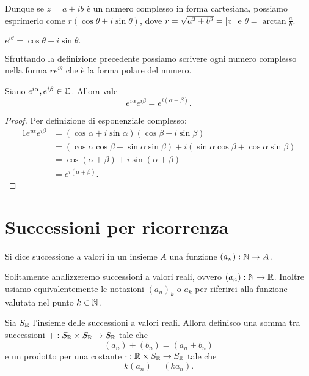 Dunque se $z = a+ib$ è un numero complesso in forma cartesiana, possiamo esprimerlo come $r(\cos\theta + i\sin\theta)$, dove $r = \sqrt{a^2 + b^2} = \left|z\right|$ e $\theta = \arctan \frac{a}{b}$.

\begin{definition}
    $e^{i\theta} = \cos\theta + i\sin\theta.$
\end{definition}

Sfruttando la definizione precedente possiamo scrivere ogni numero complesso nella forma $re^{i\theta}$ che è la forma polare del numero.

\begin{proposition}
    Siano $e^{i\alpha}, e^{i\beta} \in \mathbb{C}$. Allora vale \[
        e^{i\alpha} e^{i\beta} = e^{i(\alpha + \beta)}.
    \]
\end{proposition}
\begin{proof}
    Per definizione di esponenziale complesso:
    \begin{alignat*}{1}
        e^{i\alpha} e^{i\beta} &= (\cos\alpha + i\sin\alpha)(\cos\beta + i\sin\beta)\\
        &= (\cos\alpha \cos\beta - \sin\alpha \sin\beta) + i(\sin\alpha \cos\beta + \cos\alpha \sin\beta)\\
        &= \cos(\alpha + \beta) + i\sin(\alpha + \beta)\\
        &= e^{i(\alpha + \beta)}. \tag*{\qedhere}
    \end{alignat*}
\end{proof}

\section{Successioni per ricorrenza}

\begin{definition}[Successione]
    Si dice successione a valori in un insieme $A$ una funzione $(a_n) : \mathbb{N} \to A$.
\end{definition}

Solitamente analizzeremo successioni a valori reali, ovvero $(a_n) : \mathbb{N} \to \mathbb{R}$. Inoltre usiamo equivalentemente le notazioni $(a_n)_k$ o $a_k$ per riferirci alla funzione valutata nel punto $k \in \mathbb{N}$.

\begin{definition}
    Sia $S_{\mathbb{R}}$ l'insieme delle successioni a valori reali. Allora definisco una somma tra successioni $+ : S_{\mathbb{R}} \times S_{\mathbb{R}} \to S_{\mathbb{R}}$ tale che \[
        (a_n) + (b_n) = (a_n + b_n)  
    \] e un prodotto per una costante $\cdot : \mathbb{R} \times S_{\mathbb{R}} \to S_{\mathbb{R}}$ tale che \[
        k(a_n) = (ka_n).    
    \]
\end{definition}

